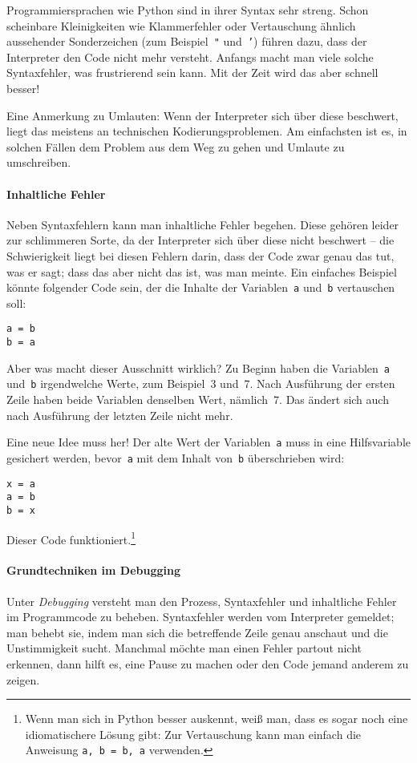 \documentclass{blatt}
\begin{document}
Programmiersprachen wie Python sind in ihrer Syntax sehr streng. Schon
scheinbare Kleinigkeiten wie Klammerfehler oder Vertauschung ähnlich
aussehender Sonderzeichen (zum Beispiel~\texttt{"} und~\texttt{'}) führen
dazu, dass der Interpreter den Code nicht mehr versteht. Anfangs macht man
viele solche Syntaxfehler, was frustrierend sein kann. Mit der Zeit wird das
aber schnell besser!

Eine Anmerkung zu Umlauten: Wenn der Interpreter sich über diese beschwert,
liegt das meistens an technischen Kodierungsproblemen. Am einfachsten ist es,
in solchen Fällen dem Problem aus dem Weg zu gehen und Umlaute zu umschreiben.

\paragraph{Inhaltliche Fehler} Neben Syntaxfehlern kann man inhaltliche Fehler
begehen. Diese gehören leider zur schlimmeren Sorte, da der Interpreter sich
über diese nicht beschwert -- die Schwierigkeit liegt bei diesen Fehlern darin,
dass der Code zwar genau das tut, was er sagt; dass das aber nicht das ist, was
man meinte. Ein einfaches Beispiel könnte folgender Code sein, der die Inhalte
der Variablen~\texttt{a} und~\texttt{b} vertauschen soll:
\begin{verbatim}
a = b
b = a
\end{verbatim}
Aber was macht dieser Ausschnitt wirklich? Zu Beginn haben die
Variablen~\texttt{a} und~\texttt{b} irgendwelche Werte, zum Beispiel~3 und~7.
Nach Ausführung der ersten Zeile haben beide Variablen denselben Wert,
nämlich~7.  Das ändert sich auch nach Ausführung der letzten Zeile nicht mehr.

Eine neue Idee muss her! Der alte Wert der Variablen~\texttt{a} muss in eine
Hilfsvariable gesichert werden, bevor~\texttt{a} mit dem Inhalt von~\texttt{b}
überschrieben wird:
\begin{verbatim}
x = a
a = b
b = x
\end{verbatim}
Dieser Code funktioniert.\footnote{Wenn man sich in Python besser auskennt,
weiß man, dass es sogar noch eine idiomatischere Lösung gibt: Zur Vertauschung
kann man einfach die Anweisung \texttt{a, b = b, a} verwenden.}


\paragraph{Grundtechniken im Debugging} Unter \emph{Debugging} versteht man den
Prozess, Syntaxfehler und inhaltliche Fehler im Programmcode zu beheben.
Syntaxfehler werden vom Interpreter gemeldet; man behebt sie, indem man sich
die betreffende Zeile genau anschaut und die Unstimmigkeit sucht. Manchmal
möchte man einen Fehler partout nicht erkennen, dann hilft es, eine Pause zu
machen oder den Code jemand anderem zu zeigen.
\end{document}
